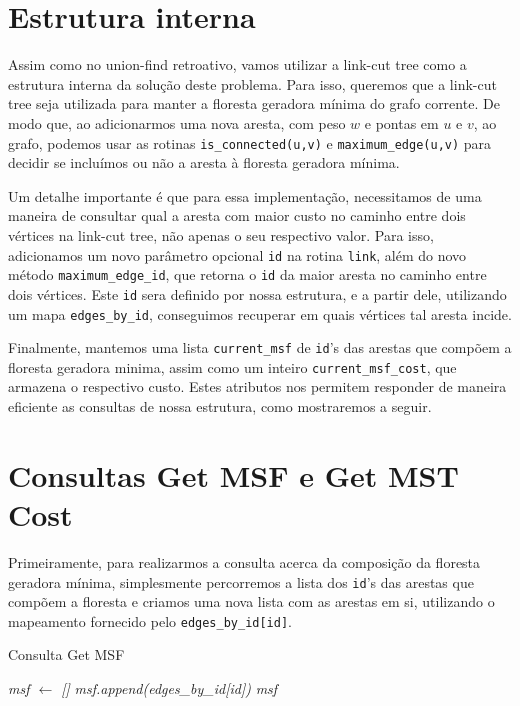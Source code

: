 \section{Estrutura interna}
\label{sec:imsf-est-int}

Assim como no union-find retroativo, vamos utilizar a link-cut tree como a estrutura interna da solução deste problema. Para isso, queremos que a link-cut tree seja utilizada para manter a floresta geradora mínima do grafo corrente. De modo que, ao adicionarmos uma nova aresta, com peso $w$ e pontas em $u$ e $v$, ao grafo, podemos usar as rotinas \texttt{is\_connected(u,v)} e \texttt{maximum\_edge(u,v)} para decidir se incluímos ou não a aresta à floresta geradora mínima.

Um detalhe importante é que para essa implementação, necessitamos de uma maneira de consultar qual a aresta com maior custo no caminho entre dois vértices na link-cut tree, não apenas o seu respectivo valor. Para isso, adicionamos um novo parâmetro opcional \texttt{id} na rotina \texttt{link}, além do novo método \texttt{maximum\_edge\_id}, que retorna o \texttt{id} da maior aresta no caminho entre dois vértices. Este \texttt{id} sera definido por nossa estrutura, e a partir dele, utilizando um mapa \texttt{edges\_by\_id}, conseguimos recuperar em quais vértices tal aresta incide.

Finalmente, mantemos uma lista \texttt{current\_msf} de \texttt{id}'s das arestas que compõem a floresta geradora minima, assim como um inteiro \texttt{current\_msf\_cost}, que armazena o respectivo custo. Estes atributos nos permitem responder de maneira eficiente as consultas de nossa estrutura, como mostraremos a seguir.

\section{Consultas Get MSF e Get MST Cost}
\label{sec:imsf-get-msf}

Primeiramente, para realizarmos a consulta acerca da composição da floresta geradora mínima, simplesmente percorremos a lista dos \texttt{id}'s das arestas que compõem a floresta e criamos uma nova lista com as arestas em si, utilizando o mapeamento fornecido pelo \texttt{edges\_by\_id[id]}.

\begin{algorithm}[h!]
    \caption{Consulta Get MSF}\label{imsf-get-msf}
    \begin{algorithmic}
        \State \emph{msf $\gets$ []}
        \State \emph{msf.append(edges\_by\_id[id])}
        \EndFor
        \State \Return \emph{msf}
        \EndFunction
    \end{algorithmic}
\end{algorithm}

